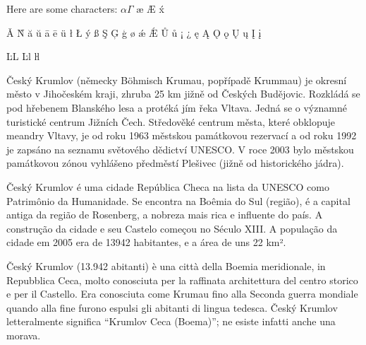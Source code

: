 

Here are some characters: $\alpha \Gamma$ æ Æ \'x

Ǎ Ǹ ă ŭ ā ē ü ł Ł ý ß Ş Ģ \c{g} ø ǽ Ǽ Ů ů ¡ ¿ ę Ą Ǫ ǫ Ų ų Į į

ĿL Ŀl ŀl

Český Krumlov (německy Böhmisch Krumau, popřípadě Krummau) je okresní
město v Jihočeském kraji, zhruba 25 km jižně od Českých
Budějovic. Rozkládá se pod hřebenem Blanského lesa a protéká jím řeka
Vltava. Jedná se o významné turistické centrum Jižních Čech.
Středověké centrum města, které obklopuje meandry Vltavy, je od roku
1963 městskou památkovou rezervací a od roku 1992 je zapsáno na
seznamu světového dědictví UNESCO. V roce 2003 bylo městskou
památkovou zónou vyhlášeno předměstí Plešivec (jižně od historického
jádra).

Český Krumlov é uma cidade República Checa na lista da UNESCO como
Patrimônio da Humanidade. Se encontra na Boêmia do Sul (região), é a
capital antiga da região de Rosenberg, a nobreza mais rica e influente
do país. A construção da cidade e seu Castelo começou no Século
XIII. A população da cidade em 2005 era de 13942 habitantes, e a área
de uns 22 km².

Český Krumlov (13.942 abitanti) è una città della Boemia meridionale,
in Repubblica Ceca, molto conosciuta per la raffinata architettura del
centro storico e per il Castello. Era conosciuta come Krumau fino alla
Seconda guerra mondiale quando alla fine furono espulsi gli abitanti
di lingua tedesca.  Český Krumlov letteralmente significa ``Krumlov
Ceca (Boema)''; ne esiste infatti anche una morava.


\bye
